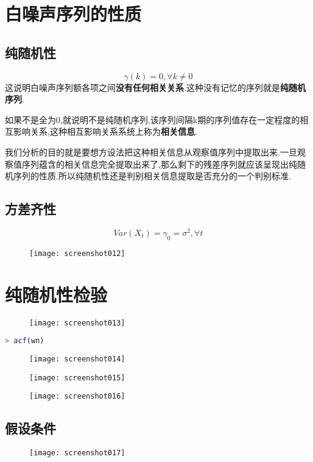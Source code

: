 \documentclass[11pt,a4paper,oneside]{book}
\begin{document}
\section{白噪声序列的性质}
\subsection{纯随机性}
$$ \gamma(k)=0,\forall k \neq 0 $$
这说明白噪声序列额各项之间\textbf{没有任何相关关系}.这种没有记忆的序列就是\textbf{纯随机序列}.

如果不是全为0,就说明不是纯随机序列,该序列间隔k期的序列值存在一定程度的相互影响关系,这种相互影响关系系统上称为\textbf{相关信息}.

我们分析的目的就是要想方设法把这种相关信息从观察值序列中提取出来.一旦观察值序列蕴含的相关信息完全提取出来了,那么剩下的残差序列就应该呈现出纯随机序列的性质.所以纯随机性还是判别相关信息提取是否充分的一个判别标准.

\subsection{方差齐性}
$$Var(X_t)=\gamma_0=\sigma^2,\forall t$$
\begin{figure}[H]
	\texttt{[image: screenshot012]}
	\label{fig:screenshot012}
\end{figure}

\section{纯随机性检验}

\begin{figure}[H]
	\texttt{[image: screenshot013]}
	\label{fig:screenshot013}
\end{figure}
\begin{lstlisting}[language=r]
> acf(wn)
\end{lstlisting}
\begin{figure}[H]
	\centering
	\texttt{[image: screenshot014]}
	\label{fig:screenshot014}
\end{figure}
\begin{figure}[H]
	\texttt{[image: screenshot015]}
	\label{fig:screenshot015}
\end{figure}
\begin{figure}[H]
	\texttt{[image: screenshot016]}
	\label{fig:screenshot016}
\end{figure}
\subsection{假设条件}
\begin{figure}[H]
	\texttt{[image: screenshot017]}
	\label{fig:screenshot017}
\end{figure}
\end{document}

